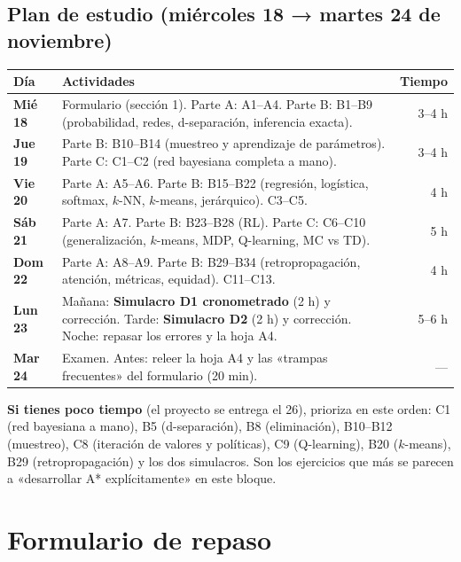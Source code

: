 \subsection*{Plan de estudio (miércoles 18 → martes 24 de noviembre)}
\begin{center}
\renewcommand{\arraystretch}{1.25}
\begin{tabularx}{\linewidth}{>{\bfseries}l X r}
\toprule
Día & Actividades & Tiempo \\
\midrule
Mié 18 & Formulario (sección 1). Parte A: A1–A4. Parte B: B1–B9 (probabilidad, redes, d-separación, inferencia exacta). & 3–4 h\\
Jue 19 & Parte B: B10–B14 (muestreo y aprendizaje de parámetros). Parte C: C1–C2 (red bayesiana completa a mano). & 3–4 h\\
Vie 20 & Parte A: A5–A6. Parte B: B15–B22 (regresión, logística, softmax, $k$-NN, $k$-means, jerárquico). C3–C5. & 4 h\\
Sáb 21 & Parte A: A7. Parte B: B23–B28 (RL). Parte C: C6–C10 (generalización, $k$-means, MDP, Q-learning, MC vs TD). & 5 h\\
Dom 22 & Parte A: A8–A9. Parte B: B29–B34 (retropropagación, atención, métricas, equidad). C11–C13. & 4 h\\
Lun 23 & Mañana: \textbf{Simulacro D1 cronometrado} (2 h) y corrección. Tarde: \textbf{Simulacro D2} (2 h) y corrección. Noche: repasar los errores y la hoja A4. & 5–6 h\\
Mar 24 & Examen. Antes: releer la hoja A4 y las «trampas frecuentes» del formulario (20 min). & —\\
\bottomrule
\end{tabularx}
\end{center}

\begin{nota}
\textbf{Si tienes poco tiempo} (el proyecto se entrega el 26), prioriza en este orden:
C1 (red bayesiana a mano), B5 (d-separación), B8 (eliminación), B10–B12 (muestreo), C8 (iteración de
valores y políticas), C9 (Q-learning), B20 ($k$-means), B29 (retropropagación) y los dos simulacros.
Son los ejercicios que más se parecen a «desarrollar A* explícitamente» en este bloque.
\end{nota}

\newpage
\section{Formulario de repaso}

